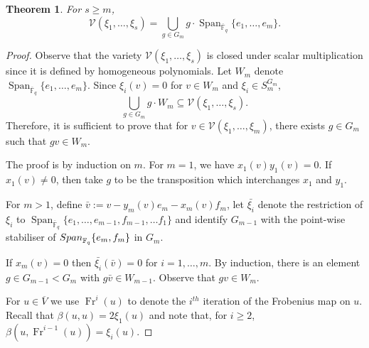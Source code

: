 \documentclass{amsart}
\newcommand{\field}{\mathbb{F}}
\newcommand{\invring}{S_m^{G_m}}
\newcommand{\V}{\mathcal{V}}
\newtheorem{thm}[subsection]{Theorem}
\DeclareMathOperator{\Span}{Span}
\DeclareMathOperator{\Fr}{Fr}
\begin{document}
\begin{thm}\label{orth_var} For $s\geq m$,
$$\V(\xi_1,\ldots,\xi_s)=\bigcup_{g\in G_m}
g\cdot\Span_{\overline{\field}_q}\{e_1,\ldots,e_m\}.$$
\end{thm}
\begin{proof} 
Observe that the variety $\V(\xi_1,\ldots,\xi_s)$ is closed under scalar multiplication 
since it is defined by homogeneous polynomials.
Let $W_m$ denote 
$\Span_{\overline{\field}_q}\{e_1,\ldots,e_m\}$.
Since $\xi_{i}(v)=0$ for $v\in W_m$ and $\xi_{i}\in \invring$, 
$$\bigcup_{g\in G_m}g\cdot W_m\subseteq \V(\xi_1,\ldots,\xi_s).$$ 
Therefore, it is sufficient to prove that for 
$v\in \V( \xi_1,\ldots,\xi_{m})$, there exists $g\in G_m$ such that
$gv\in W_m$.

The proof is by induction on $m$. For $m=1$, we have $x_1(v)y_1(v)=0$. If $x_1(v)\not=0$, then take $g$ to be the transposition which interchanges $x_1$ and $y_1$.

For $m>1$, define $\bar{v}:=v-y_m(v)e_m-x_m(v)f_m$, let
$\bar{\xi_{i}}$ denote the restriction of $\xi_{i}$ to 
$\Span_{\overline{\field}_q}\{e_1,\ldots,e_{m-1},f_{m-1},\ldots f_1\}$  and
identify $G_{m-1}$ with the point-wise stabiliser of  
${\rm Span}_{\field_q}\{e_m,f_m\}$ in $G_m$.

If $x_m(v)=0$ then $\bar{\xi_{i}}(\bar{v})=0$ for $i=1,\ldots,m$.
By induction, there is an element $g\in G_{m-1}< G_m$
with $g\bar{v}\in W_{m-1}$. Observe that 
$gv\in W_m$.


For $u\in \overline{V}$ we use $\Fr^i(u)$ to denote the $i^{th}$ iteration of the Frobenius map on $u$.
Recall that $\beta(u,u)=2\xi_1(u)$ and note that, for $i\geq2$,
$\beta(u,\Fr^{i-1}(u))=\xi_{i}(u)$.


\end{proof}
\end{document}
